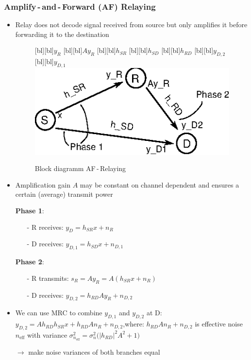 \documentclass[a4paper, 10pt]{article}
\begin{document}
\subsubsection{Amplify\,-\,and\,-\,Forward (AF) Relaying}
\begin{itemize}
	\item Relay does not decode signal received from source but only amplifies it before forwarding it to the destination
	\begin{figure}[ht]
		\centering
		[bl][bl]{$y_R$}
		[bl][bl]{$Ay_R$}
		[bl][bl]{$h_{SR}$}
		[bl][bl]{$h_{SD}$}
		[bl][bl]{$h_{RD}$}	
		[bl][bl]{$y_{D,2}$}
		[bl][bl]{$y_{D,1}$}
		\includegraphics[scale=1.5]{AF_Relaying}
		\caption{Block diagramm AF\,-\,Relaying}	
		\label{fig:af_relaying}
	\end{figure}
	\item Amplification gain $A $ may be constant on channel dependent and ensures a certain (average) transmit power
	\item[] \textbf{Phase 1}:
	\begin{itemize}
		\item[-] R receives: $y_D = h_{SR}x + n_R $
		\item[-] D receives: $y_{D,1} = h_{SD}x + n_{D,1} $
	\end{itemize}
	\item[] \textbf{Phase 2}:
	\begin{itemize}
		\item[-] R transmits: $s_R = Ay_R = A(h_{SR}x + n_R) $
		\item[-] D receives: $y_{D,2} = h_{RD}Ay_R + n_{D,2} $  
	\end{itemize}
	\item We can use MRC to combine $y_{D,1} $ and $ y_{D,2} $ at D: $ y_{D,2} = Ah_{RD}h_{SR}x + h_{RD}An_R + n_{D,2} $,\quad where: $ h_{RD}An_R + n_{D,2} $ is effective noise $n_{\text{eff}} $ with variance $\sigma_{n_\text{eff}}^2 = \sigma_n^2\bigl(|h_{RD}|^2A^2 + 1\bigr) $
	\item[$\rightarrow$] make noise variances of both branches equal
\end{itemize}
\end{document}
